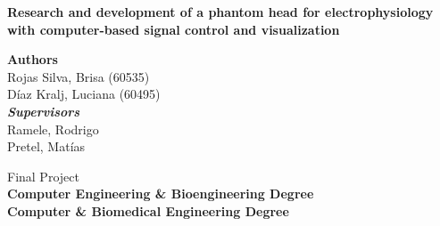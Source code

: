 \begin{titlepage}
	
	
	\thispagestyle{frontpage}
	
	\begin{center}
		
		\vspace*{4\baselineskip}
	
		
		{\Huge \textbf{Research and development of a phantom head for electrophysiology with computer-based signal control and visualization\\}}
		
		
        \vspace*{1\baselineskip}

        \large{\textbf{Authors}}\\
        Rojas Silva, Brisa (60535)\\
        Díaz Kralj, Luciana (60495)\\
        
        \emph{\textbf{Supervisors}}\\
        Ramele, Rodrigo\\
        Pretel, Matías\\
		
		\vspace{1\baselineskip}
		
		\large{Final Project}\\
        \large{\textbf{Computer Engineering \& Bioengineering Degree}}\\
        \large{\textbf{Computer \& Biomedical Engineering Degree}}\\


		
		\vspace{1\baselineskip}

	\end{center}
	
	\vspace*{4\baselineskip}
	
	
\end{titlepage}
